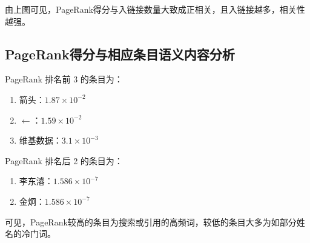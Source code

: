 \documentclass[a4paper]{article}
\begin{document}
由上图可见，PageRank得分与入链接数量大致成正相关，且入链接越多，相关性越强。

\subsection{PageRank得分与相应条目语义内容分析}

PageRank 排名前 3 的条目为：

\begin{enumerate}
    \item 箭头：$1.87\times 10^{-2}$
    \item $\leftarrow$：$1.59\times 10^{-2}$
    \item 维基数据：$3.1\times 10^{-3}$
\end{enumerate}

PageRank 排名后 2 的条目为：

\begin{enumerate}
    \item 李东濬：$1.586\times 10^{-7}$
    \item 金炯：$1.586\times 10^{-7}$
\end{enumerate}

可见，PageRank较高的条目为搜索或引用的高频词，较低的条目大多为如部分姓名的冷门词。
\end{document}
